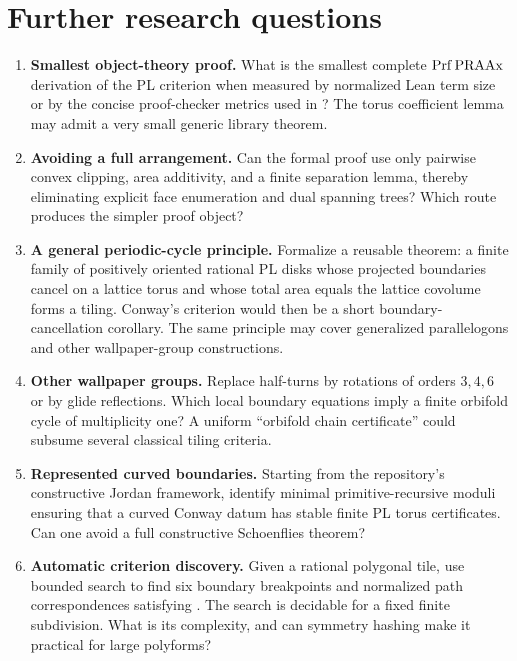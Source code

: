 \section{Further research questions}
\label{sec:further}

\begin{enumerate}[label=\textbf{Q\arabic*.},leftmargin=*]
\item \textbf{Smallest object-theory proof.}  What is the smallest complete \(\mathrm{Prf}\,\mathrm{PRAAx}\) derivation of the PL criterion when measured by normalized Lean term size or by the concise proof-checker metrics used in ?  The torus coefficient lemma may admit a very small generic library theorem.

\item \textbf{Avoiding a full arrangement.}  Can the formal proof use only pairwise convex clipping, area additivity, and a finite separation lemma, thereby eliminating explicit face enumeration and dual spanning trees?  Which route produces the simpler proof object?

\item \textbf{A general periodic-cycle principle.}  Formalize a reusable theorem: a finite family of positively oriented rational PL disks whose projected boundaries cancel on a lattice torus and whose total area equals the lattice covolume forms a tiling.  Conway's criterion would then be a short boundary-cancellation corollary.  The same principle may cover generalized parallelogons and other wallpaper-group constructions.

\item \textbf{Other wallpaper groups.}  Replace half-turns by rotations of orders \(3,4,6\) or by glide reflections.  Which local boundary equations imply a finite orbifold cycle of multiplicity one?  A uniform ``orbifold chain certificate'' could subsume several classical tiling criteria.

\item \textbf{Represented curved boundaries.}  Starting from the repository's constructive Jordan framework, identify minimal primitive-recursive moduli ensuring that a curved Conway datum has stable finite PL torus certificates.  Can one avoid a full constructive Schoenflies theorem?

\item \textbf{Automatic criterion discovery.}  Given a rational polygonal tile, use bounded search to find six boundary breakpoints and normalized path correspondences satisfying .  The search is decidable for a fixed finite subdivision.  What is its complexity, and can symmetry hashing make it practical for large polyforms?


\end{enumerate}
